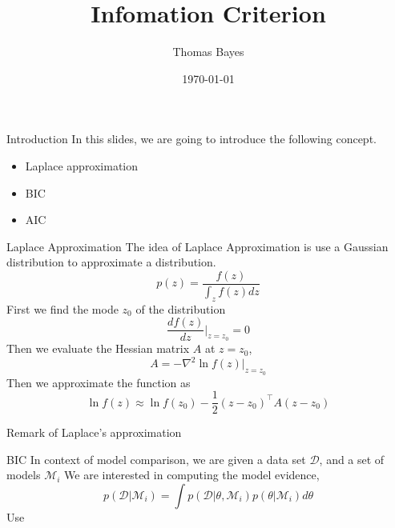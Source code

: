 \documentclass{beamer}
\title{Infomation Criterion}
\author{Thomas Bayes}
\institute{
\texttt{[image: ../bayes.png]}%
}
\date{\today}
\begin{document}
    
\frame{\titlepage}

\begin{frame}{Introduction}
In this slides, we are going to introduce the following concept.
\begin{itemize}
\item Laplace approximation
\item BIC
\item AIC
\end{itemize}
\end{frame}
\begin{frame}[allowframebreaks]{Laplace Approximation}
The idea of Laplace Approximation is use a Gaussian distribution to approximate a distribution.
$$p(z) = \frac{f(z)}{\int_z f(z) dz}$$
First we find the mode $z_0$ of the distribution
$$\frac{d f(z)}{dz} \Bigr|_{z=z_0} = 0$$
Then we evaluate the Hessian matrix $A$ at $z=z_0$, 
$$A = -\nabla^2 \ln f(z) \Bigr|_{z=z_0}$$
Then we approximate the function as 
$$\ln f(z) \approx \ln f(z_0) - \frac{1}{2} (z - z_0)^\top A (z - z_0)$$

\framebreak

Remark of Laplace's approximation
\end{frame}

\begin{frame}{BIC}
In context of model comparison, we are given a data set $\mathcal{D}$, and a set of models $\mathcal{M}_i$
We are interested in computing the model evidence, 
$$p(\mathcal{D} | \mathcal{M}_i) = \int p(\mathcal{D} | \theta, \mathcal{M}_i) p(\theta | \mathcal{M}_i) d\theta$$
Use 

\end{frame}
\end{document}
